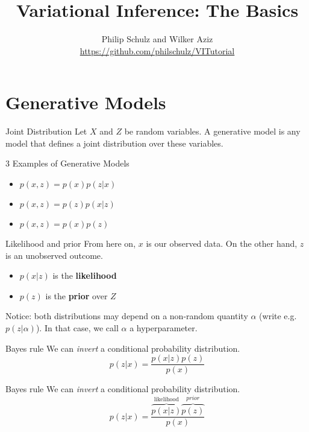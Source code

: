 \documentclass[14pt]{beamer}
\title{Variational Inference: The Basics}
\date{}
\author[Schulz and Aziz]{Philip Schulz and Wilker Aziz \\
\url{https://github.com/philschulz/VITutorial}}
\begin{document}
\frame{\titlepage}

\frame{\tableofcontents}

\section{Generative Models}
\frame{\tableofcontents[currentsection]}

\begin{frame}{Joint Distribution}
Let $ X $ and $ Z $ be random variables. A generative model is any model that defines a joint distribution
over these variables. 
\pause
\begin{block}{3 Examples of Generative Models}
\begin{itemize}
\item $ p(x,z) = p(x) p(z|x) $
\item $ p(x,z) = p(z) p(x|z) $
\item $ p(x,z) = p(x) p(z) $
\end{itemize}
\end{block}
\end{frame}

\begin{frame}{Likelihood and prior}
From here on, $ x $ is our observed data. On the other hand, $ z $ is an unobserved outcome. 
\begin{itemize}
\item $ p(x|z) $ is the \textbf{likelihood}
\item $ p(z) $ is the \textbf{prior} over $ Z $
\end{itemize} 
Notice: both distributions may depend on a non-random quantity $ \alpha $ (write e.g. $ p(z|\alpha) $). In that case, we 
call $ \alpha $ a hyperparameter.
\end{frame}

\begin{frame}{Bayes rule}
We can \textit{invert} a conditional probability distribution.
\begin{equation*}
p(z|x) = \frac{p(x|z)p(z)}{p(x)}
\end{equation*}
\end{frame}

\begin{frame}{Bayes rule}
We can \textit{invert} a conditional probability distribution.
\begin{equation*}
p(z|x) = \frac{\overbrace{p(x|z)}^{\text{likelihood}}\overbrace{p(z)}^{prior}}{p(x)}
\end{equation*}
\end{frame}
\end{document}
